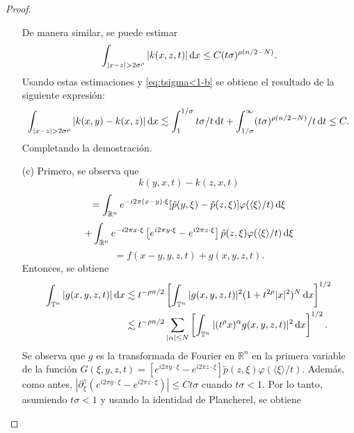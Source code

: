 \begin{proof}
\begin{itemize}
\begin{equation*}
		\end{equation*}
		De manera similar, se puede estimar 
		\begin{equation*}
			\int_{|x-z|>2\sigma^\rho} |k(x, z, t)| \diff x \leq C(t\sigma)^{\rho(n/2 - N)}.
		\end{equation*}
		Usando estas estimaciones y \cref{eq:tsigma<1-b} se obtiene el resultado de la siguiente expresión:
		\begin{equation}
			\int_{|x-z| > 2\sigma^\rho}|k(x, y) - k(x, z)|\mathop{}\!\mathrm{d} x \lesssim \int_1^{1/\sigma} t\sigma/t \mathop{}\!\mathrm{d} t + \int_{1/\sigma}^\infty(t\sigma)^{\rho(n/2-N)}/t\mathop{}\!\mathrm{d} t \leq C
			\label{eq:ultima-cota-b}.
		\end{equation} 
		Completando la demostración.\\
		
		\item[(c)] Primero, se observa que
		\begin{equation*}
			k(y, x, t) - k(z, x, t) 
		\end{equation*}
		\begin{equation*}
			=\int_{\mathbb{R}^n} e^{-i2\pi (x-y) \cdot \xi}[\tilde{p}(y, \xi) - \tilde{p}(z, \xi)]\varphi(\langle\xi\rangle/t) \mathop{}\!\mathrm{d} \xi
		\end{equation*}
		\begin{equation*}
			+  
			\int_{\mathbb{R}^n} e^{-i2\pi x \cdot \xi} \left[ e^{i2\pi y \cdot \xi} -e^{i2\pi z \cdot \xi}  \right]\tilde{p}(z, \xi)\varphi(\langle\xi\rangle/t) \mathop{}\!\mathrm{d} \xi
		\end{equation*}
		\begin{equation*}
			=f(x-y, y, z, t) + g(x, y, z, t).
		\end{equation*}
		Entonces, se obtiene 
		\begin{align*}
			\int_{\mathbb{T}^n}|g(x, y, z, t)|\mathop{}\!\mathrm{d} x  & \lesssim t^{-\rho n/2} \left[ \int_{\mathbb{T}^n} |g(x, y, z, t)|^2(1 + t^{2\rho}|x|^2)^N \mathop{}\!\mathrm{d} x  \right]^{1/2}\\
			 & \lesssim t^{-\rho n/2} \sum_{|\alpha|\leq N}  \left[ \int_{\mathbb{T}^n} |(t^\rho x)^\alpha g(x, y, z, t)|^2\mathop{}\!\mathrm{d} x  \right]^{1/2}.
		\end{align*}
		Se observa que $g$ es la transformada de Fourier en $\mathbb{R}^n$ en la primera variable de la función $G(\xi, y, z, t) = \left[ e^{i2\pi y \cdot \xi} -e^{i2\pi z \cdot \xi}  \right]\tilde{p}(z, \xi)\varphi(\langle\xi\rangle/t)$. Además, como antes, $|\partial^\gamma_\xi( e^{i2\pi y \cdot \xi} -e^{i2\pi z \cdot \xi}  )| \leq Ct\sigma$ cuando $t\sigma<1$. Por lo tanto, asumiendo $t\sigma < 1$ y usando la identidad de Plancherel, se obtiene

\end{itemize}
\end{proof}
